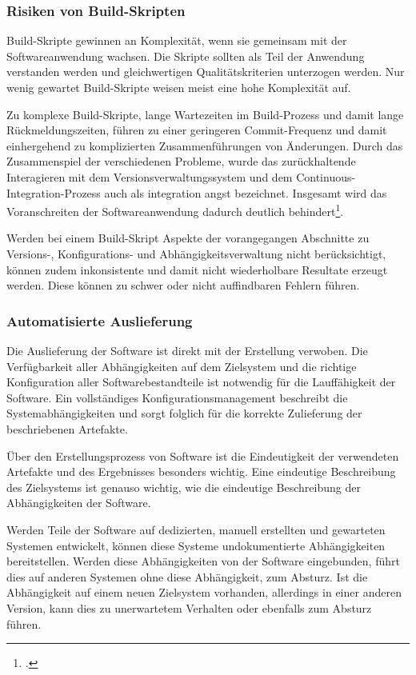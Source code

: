 \subsubsection{Risiken von Build-Skripten}

Build-Skripte gewinnen an Komplexität, wenn sie gemeinsam mit der Softwareanwendung wachsen. Die Skripte sollten als Teil der Anwendung verstanden werden und gleichwertigen Qualitätskriterien unterzogen werden. Nur wenig gewartet Build-Skripte weisen meist eine hohe Komplexität auf.

Zu komplexe Build-Skripte, lange Wartezeiten im Build-Prozess und damit lange Rückmeldungszeiten, führen zu einer geringeren Commit-Frequenz und damit einhergehend zu komplizierten Zusammenführungen von Änderungen. Durch das Zusammenspiel der verschiedenen Probleme, wurde das zurückhaltende Interagieren mit dem Versionsverwaltungssystem und dem Continuous-Integration-Prozess auch als \glqq integration angst\grqq{} bezeichnet. Insgesamt wird das Voranschreiten der Softwareanwendung dadurch deutlich behindert\footcite[vgl.][S. 3 ff]{ci-is-not-build-systems}.

Werden bei einem Build-Skript Aspekte der vorangegangen Abschnitte zu Versions-, Konfigurations- und Abhängigkeitsverwaltung nicht berücksichtigt, können zudem inkonsistente und damit nicht
wiederholbare Resultate erzeugt werden. Diese können zu schwer oder nicht auffindbaren Fehlern führen.

\subsubsection{Automatisierte Auslieferung}

Die Auslieferung der Software ist direkt mit der Erstellung verwoben. Die Verfügbarkeit aller Abhängigkeiten auf dem Zielsystem und die richtige Konfiguration aller Softwarebestandteile ist notwendig für die Lauffähigkeit der Software.
Ein vollständiges Konfigurationsmanagement beschreibt die Systemabhängigkeiten und sorgt folglich für die korrekte Zulieferung der beschriebenen Artefakte.

Über den Erstellungsprozess von Software ist die Eindeutigkeit der verwendeten Artefakte und des Ergebnisses besonders wichtig. Eine eindeutige Beschreibung des Zielsystems ist genauso wichtig, wie die eindeutige Beschreibung der Abhängigkeiten der Software.

Werden Teile der Software auf dedizierten, manuell erstellten und gewarteten Systemen entwickelt, können diese Systeme undokumentierte Abhängigkeiten bereitstellen. Werden diese Abhängigkeiten von der Software eingebunden, führt dies auf anderen Systemen ohne diese Abhängigkeit, zum Absturz. Ist die Abhängigkeit auf einem neuen Zielsystem vorhanden, allerdings in einer anderen Version, kann dies zu unerwartetem Verhalten oder ebenfalls zum Absturz führen.

